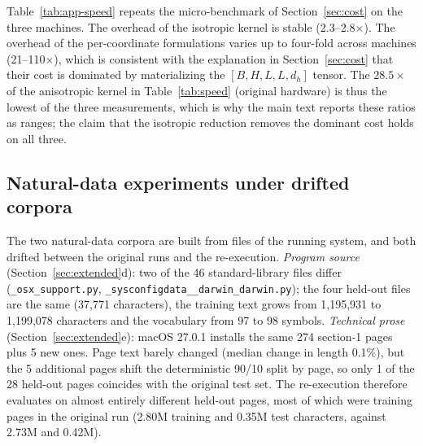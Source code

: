 \documentclass[11pt]{article}
\begin{document}
Table~\ref{tab:app-speed} repeats the micro-benchmark of Section~\ref{sec:cost} on the three machines. The overhead of the isotropic kernel is stable (2.3--2.8$\times$). The overhead of the per-coordinate formulations varies up to four-fold across machines (21--110$\times$), which is consistent with the explanation in Section~\ref{sec:cost} that their cost is dominated by materializing the $[B, H, L, L, d_h]$ tensor. The $28.5\times$ of the anisotropic kernel in Table~\ref{tab:speed} (original hardware) is thus the lowest of the three measurements, which is why the main text reports these ratios as ranges; the claim that the isotropic reduction removes the dominant cost holds on all three.

\begin{table}[h]
\centering\small
{}
\caption{Speed micro-benchmark (\texttt{fast\_gaussian\_test.py bench}: one attention module, forward+backward, $B{=}32$, $L{=}60$, $d{=}128$, one CPU thread), ms per step and ratio to Euclidean attention on the same machine.}
\label{tab:app-speed}
\end{table}

\subsection{Natural-data experiments under drifted corpora}\label{app:natural}

The two natural-data corpora are built from files of the running system, and both drifted between the original runs and the re-execution.
\emph{Program source} (Section~\ref{sec:extended}d): two of the 46 standard-library files differ (\texttt{\_osx\_support.py}, \texttt{\_sysconfigdata\_\_darwin\_darwin.py}); the four held-out files are the same (37{,}771 characters), the training text grows from 1{,}195{,}931 to 1{,}199{,}078 characters and the vocabulary from 97 to 98 symbols.
\emph{Technical prose} (Section~\ref{sec:extended}e): macOS 27.0.1 installs the same 274 section-1 pages plus 5 new ones. Page text barely changed (median change in length 0.1\%), but the 5 additional pages shift the deterministic 90/10 split by page, so only 1 of the 28 held-out pages coincides with the original test set. The re-execution therefore evaluates on almost entirely different held-out pages, most of which were training pages in the original run (2.80M training and 0.35M test characters, against 2.73M and 0.42M).
\end{document}
